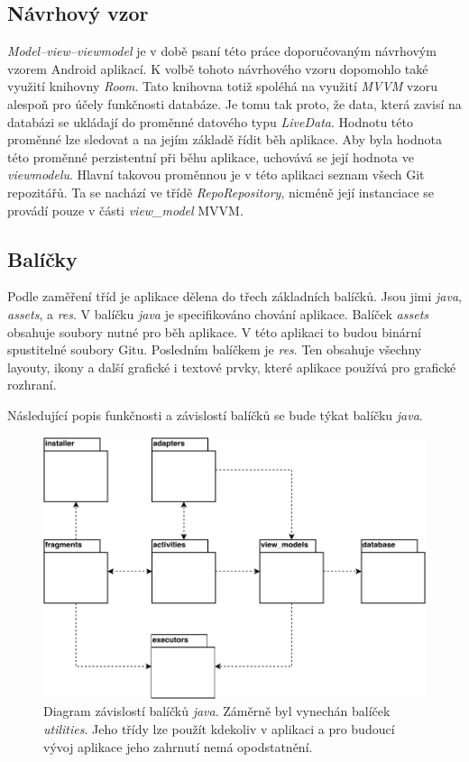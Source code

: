         \subsection{Návrhový vzor}
        \emph{Model–view–viewmodel} je v době psaní této práce doporučovaným návrhovým vzorem Android aplikací. K volbě tohoto návrhového vzoru dopomohlo také využití knihovny \emph{Room}. Tato knihovna totiž spoléhá na využití \emph{MVVM} vzoru alespoň pro účely funkčnosti databáze. Je tomu tak proto, že data, která zavisí na databázi se ukládají do proměnné datového typu \emph{LiveData}. Hodnotu této proměnné lze sledovat a na jejím základě řídit běh aplikace. Aby byla hodnota této proměnné perzistentní při běhu aplikace, uchovává se její hodnota ve \emph{viewmodelu}. Hlavní takovou proměnnou je v této aplikaci seznam všech Git repozitářů. Ta se nachází ve třídě \emph{RepoRepository}, nicméně její instanciace se provádí pouze v části \emph{view\_model} MVVM.

        \newpage
        \subsection{Balíčky}
        Podle zaměření tříd je aplikace dělena do třech základních balíčků. Jsou jimi \emph{java}, \emph{assets}, a \emph{res}. V balíčku \emph{java} je specifikováno chování aplikace. Balíček \emph{assets} obsahuje soubory nutné pro běh aplikace. V této aplikaci to budou binární spustitelné soubory Gitu. Posledním balíčkem je \emph{res}. Ten obsahuje všechny layouty, ikony a další grafické i textové prvky, které aplikace používá pro grafické rozhraní.

        Následující popis funkčnosti a závislostí balíčků se bude týkat balíčku \emph{java}.

        \begin{figure}[h]
            \centering
            \vspace{0.5cm}
            \includegraphics[]{obrazky-figures/drawio/package_diagram.pdf}
            \caption{Diagram závislostí balíčků \emph{java}. Záměrně byl vynechán balíček \emph{utilities}. Jeho třídy lze použít kdekoliv v aplikaci a pro budoucí vývoj aplikace jeho zahrnutí nemá opodstatnění. }
            \label{diagram:packages}
        \end{figure}

